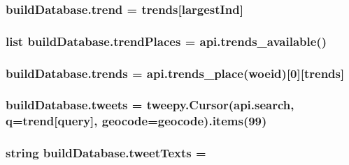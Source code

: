 \subsubsection[{\texorpdfstring{trend}{trend}}]{\setlength{\rightskip}{0pt plus 5cm}build\+Database.\+trend = {\bf trends}\mbox{[}{\bf largest\+Ind}\mbox{]}}\hypertarget{namespacebuildDatabase_afe0b1b9174b6ce79a6fca681db02d2c6}{}\label{namespacebuildDatabase_afe0b1b9174b6ce79a6fca681db02d2c6}
\subsubsection[{\texorpdfstring{trend\+Places}{trendPlaces}}]{\setlength{\rightskip}{0pt plus 5cm}list build\+Database.\+trend\+Places = api.\+trends\+\_\+available()}\hypertarget{namespacebuildDatabase_a0233021004fd1bc913cd8e1c81f51bdd}{}\label{namespacebuildDatabase_a0233021004fd1bc913cd8e1c81f51bdd}
\subsubsection[{\texorpdfstring{trends}{trends}}]{\setlength{\rightskip}{0pt plus 5cm}build\+Database.\+trends = api.\+trends\+\_\+place({\bf woeid})\mbox{[}0\mbox{]}\mbox{[}\textquotesingle{}trends\textquotesingle{}\mbox{]}}\hypertarget{namespacebuildDatabase_a00e15f8c5a38ef71e1176db990041ee0}{}\label{namespacebuildDatabase_a00e15f8c5a38ef71e1176db990041ee0}
\subsubsection[{\texorpdfstring{tweets}{tweets}}]{\setlength{\rightskip}{0pt plus 5cm}build\+Database.\+tweets = tweepy.\+Cursor(api.\+search, {\bf q}={\bf trend}\mbox{[}\textquotesingle{}query\textquotesingle{}\mbox{]}, {\bf geocode}={\bf geocode}).items(99)}\hypertarget{namespacebuildDatabase_a41e7e514b01675f060ab36db44904a13}{}\label{namespacebuildDatabase_a41e7e514b01675f060ab36db44904a13}
\subsubsection[{\texorpdfstring{tweet\+Texts}{tweetTexts}}]{\setlength{\rightskip}{0pt plus 5cm}string build\+Database.\+tweet\+Texts = \textquotesingle{}\textquotesingle{}}\hypertarget{namespacebuildDatabase_a6b90ef6e990c311046eeaed437c20194}{}\label{namespacebuildDatabase_a6b90ef6e990c311046eeaed437c20194}
